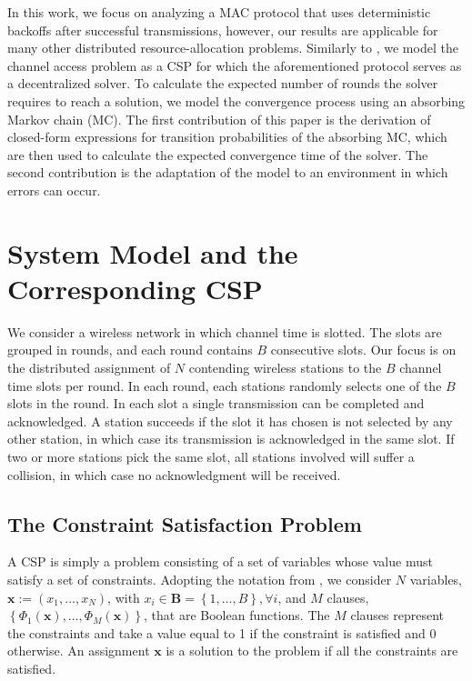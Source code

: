 \documentclass[journal]{IEEEtran}
\begin{document}
In this work, we focus on analyzing a MAC protocol that uses deterministic backoffs after successful transmissions, however, our results are applicable for many other distributed resource-allocation problems. Similarly to \cite{duffy2011dcs}, we model the channel access problem as a CSP for which the aforementioned protocol serves as a decentralized solver. To calculate the expected number of rounds the solver requires to reach a solution, we model the convergence process using an absorbing Markov chain (MC). The first contribution of this paper is the derivation of closed-form expressions for transition probabilities of the absorbing MC, which are then used to calculate the expected convergence time of the solver. The second contribution is the adaptation of the model to an environment in which errors can occur. 

\section{System Model and the Corresponding CSP}

We consider a wireless network in which channel time is slotted.
The slots are grouped in rounds, and each round contains $B$ consecutive slots.
Our focus is on the distributed assignment of $N$ contending wireless stations to the $B$ channel time slots per round.
In each round, each stations randomly selects one of the $B$ slots in the round.
In each slot a single transmission can be completed and acknowledged.
A station succeeds if the slot it has chosen is not selected by any other station, in which case its transmission is acknowledged in the same slot.
If two or more stations pick the same slot, all stations involved will suffer a collision, in which case no acknowledgment will be received.

\subsection{The Constraint Satisfaction Problem}
A CSP is simply a problem consisting of a set of variables whose value must satisfy a set of constraints. Adopting the notation from \cite{duffy2011dcs}, we consider $N$ variables, \mbox{$\mathbf{x} := (x_1,\dots,x_N)$}, with $x_i \in \mathbf{B}=\left\{1, \dots, B \right\}, \forall i $, and $M$ clauses, $\left\{ \Phi_1(\mathbf{x}),\dots,\Phi_M(\mathbf{x}) \right\}$, that are Boolean functions.
The $M$ clauses represent the constraints and take a value equal to 1 if the constraint is satisfied and 0 otherwise.
An assignment $\mathbf{x}$ is a solution to the problem if all the constraints are satisfied.
\end{document}

